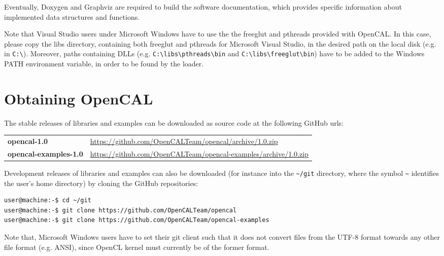 \noindent Eventually, Doxygen and Graphviz are required to build the
software documentation, which provides specific information about
implemented data structures and functions.

Note that Visual Studio users under Microsoft Windows have to use the
the freeglut and pthreads provided with OpenCAL. In this case,
please copy the libs directory, containing both freeglut and pthreads
for Microsoft Visual Studio, in the desired path on the local disk
(e.g. in \verb'C:\'). Moreover, paths containing DLLs
(e.g. \verb'C:\libs\pthreads\bin' and \verb'C:\libs\freeglut\bin')
have to be added to the Windows PATH environment variable, in order to
be found by the loader.

\section{Obtaining OpenCAL}

The stable releases of libraries and examples can be downloaded as source code at the
following GitHub urls:

\begin{table}[h]
  \centering
  \begin{tabularx}{\textwidth}{lX}
    \textbf{opencal-1.0} & \url{https://github.com/OpenCALTeam/opencal/archive/1.0.zip}\\
    \textbf{opencal-examples-1.0} & \url{https://github.com/OpenCALTeam/opencal-examples/archive/1.0.zip}\\
  \end{tabularx}
\end{table}

\noindent Development releases of libraries and examples can also be
downloaded (for instance into the \verb'~/git' directory, where the
symbol \verb'~' identifies the user's home directory) by cloning the
GitHub repositories:

\begin{lstlisting}[numbers=none,language=bash]
user@machine:-$ cd ~/git
user@machine:-$ git clone https://github.com/OpenCALTeam/opencal
user@machine:-$ git clone https://github.com/OpenCALTeam/opencal-examples
\end{lstlisting}

Note that, Microsoft Windows users have to set their git client such
that it does not convert files from the UTF-8 format towards any other
file format (e.g. ANSI), since OpenCL kernel must currently be of the
former format.


